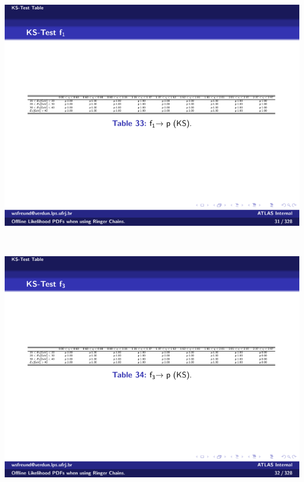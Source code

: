 \begin{table}[p]\ContinuedFloat\addtocounter{table}{-1}%
\begin{subtable}{\textwidth}
\caption{\fI{}\label{tab:gof_ks_p_values_f1}}
\includegraphics[width=\textwidth]{appendices/figures/gof/f1_ks_table.pdf}
\end{subtable} \\
\begin{subtable}{\textwidth}
\caption{\fIII{}\label{tab:gof_ks_p_values_f3}}
\includegraphics[width=\textwidth]{appendices/figures/gof/f3_ks_table.pdf}
\end{subtable} \\
\begin{subtable}{\textwidth}

\end{subtable}
\end{table}
